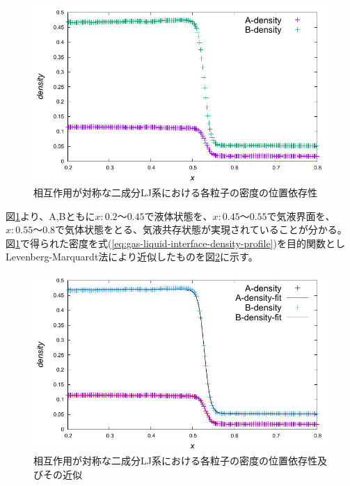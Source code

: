 \documentclass[titlepage]{jsreport}
\begin{document}
\begin{figure}[htbp]
    \begin{center}
        \includegraphics[width=14cm]{fig/lan140493-lbn561971-ran3930-rbn15722/lan140493-lbn561971-ran3930-rbn15722.pdf}
    \end{center}
    \caption{相互作用が対称な二成分LJ系における各粒子の密度の位置依存性}
    \label{fig:lan140493-lbn561971-ran3930-rbn15722}
\end{figure}

\newpage
図\ref{fig:lan140493-lbn561971-ran3930-rbn15722}より、A,Bともに$x:0.2〜0.45$で液体状態を、$x:0.45〜0.55$で気液界面を、$x:0.55〜0.8$で気体状態をとる、気液共存状態が実現されていることが分かる。図\ref{fig:lan140493-lbn561971-ran3930-rbn15722}で得られた密度を式(\ref{eq:gas-liquid-interface-density-profile})を目的関数としLevenberg-Marquardt法により近似したものを図\ref{fig:lan140493-lbn561971-ran3930-rbn15722-fitting}に示す。

\begin{figure}[htbp]
    \begin{center}
        \includegraphics[width=14cm]{fig/lan140493-lbn561971-ran3930-rbn15722/lan140493-lbn561971-ran3930-rbn15722-fitting.pdf}
    \end{center}
    \caption{相互作用が対称な二成分LJ系における各粒子の密度の位置依存性及びその近似}
    \label{fig:lan140493-lbn561971-ran3930-rbn15722-fitting}
\end{figure}
\end{document}
